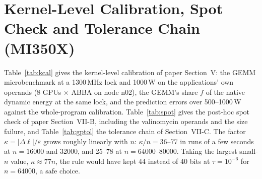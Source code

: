 \documentclass[conference]{IEEEtran}
\newcommand{\W}{\,W}
\begin{document}
\section{Kernel-Level Calibration, Spot Check and Tolerance Chain (MI350X)}\label{sec:kcal}

Table~\ref{tab:kcal} gives the kernel-level calibration of paper Section~V: the GEMM microbenchmark at a 1300\,MHz lock
and 1000\W{} on the applications' own operands (8 GPUs $\times$ ABBA on node n02), the GEMM's share $f$ of the native
dynamic energy at the same lock, and the prediction errors over 500--1000\W{} against the whole-program calibration.
Table~\ref{tab:spot} gives the post-hoc spot check of paper Section~VII-B, including the valinomycin operands and the
size failure, and Table~\ref{tab:gptol} the tolerance chain
of Section~VII-C. The factor $\kappa=|\Delta\ell|/\varepsilon$ grows roughly linearly with $n$: $\kappa/n=36$--77 in
runs of a few seconds at $n=16000$ and 32000, and 25--78 at $n=64000$--80000. Taking the largest small-$n$ value,
$\kappa\approx77n$, the rule would have kept 44 instead of 40 bits at $\tau=10^{-6}$ for $n=64000$, a safe choice.
\end{document}
